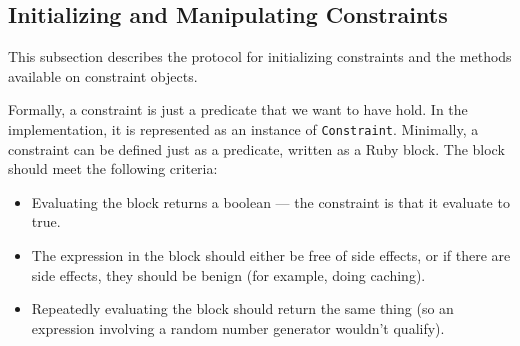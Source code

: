 
\subsection{Initializing and Manipulating Constraints}
\label{sec:initializing-constraints}

This subsection describes the protocol for initializing constraints
and the methods available on constraint objects.

Formally, a constraint is just a predicate that we want to have hold.
In the implementation, it is represented as an instance of
\lstinline{Constraint}.  Minimally, a constraint can be defined just
as a predicate, written as a Ruby block.  The block should meet the
following criteria:

\begin{itemize}

\item Evaluating the block returns a boolean --- the constraint is
  that it evaluate to true.

\item The expression in the block should either be free of side
  effects, or if there are side effects, they should be benign (for
  example, doing caching).  

\item Repeatedly evaluating the block should return the same thing (so
  an expression involving a random number generator wouldn't qualify).

\end{itemize}

